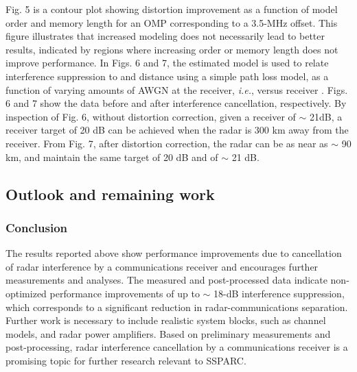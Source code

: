 \documentclass[11pt,onecolumn]{IEEEtran}
\begin{document}
Fig. 5 is a contour plot showing distortion improvement as a function of model order and memory length for an OMP corresponding to a 3.5-MHz offset.  This figure illustrates that increased modeling does not necessarily lead to better results, indicated by regions where increasing order or memory length does not improve performance.  
In Figs. 6 and 7, the estimated model is used to relate interference suppression to \SINR and distance using a simple path loss model, as a function of varying amounts of AWGN at the receiver, \emph{i.e.}, versus receiver \SNR.  Figs. 6 and 7 show the data before and after interference cancellation, respectively.  By inspection of Fig. 6, without distortion correction, given a receiver \SNR of $\sim$ 21dB, a receiver target \SINR of 20 dB can be achieved when the radar is 300 km away from the receiver.  From Fig. 7, after distortion correction, the radar can be as near as $\sim$ 90 km, and maintain the same target \SINR of 20 dB and \SNR of $\sim$ 21 dB.  

\subsection{Outlook and remaining work}


\subsubsection{Conclusion}
The results reported above show performance improvements due to cancellation of radar interference by a communications receiver and encourages further measurements and analyses.  
The measured and post-processed data indicate non-optimized performance improvements of up to $\sim$ 18-dB interference suppression, which corresponds to a significant reduction in radar-communications separation.  Further work is necessary to include realistic system blocks, such as channel models, and radar power amplifiers.  Based on preliminary measurements and post-processing, radar interference cancellation by a communications receiver is a promising topic for further research relevant to SSPARC.
\end{document}

